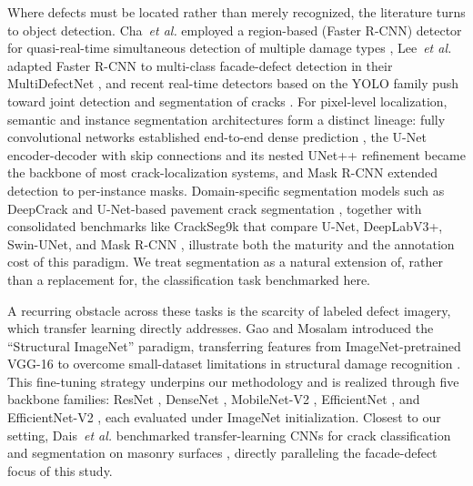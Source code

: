 \documentclass[conference]{IEEEtran}
\begin{document}
Where defects must be located rather than merely recognized, the literature turns to object detection. Cha~\textit{et al.} employed a region-based (Faster R-CNN) detector for quasi-real-time simultaneous detection of multiple damage types \cite{ref12}, Lee~\textit{et al.} adapted Faster R-CNN to multi-class facade-defect detection in their MultiDefectNet \cite{ref13}, and recent real-time detectors based on the YOLO family push toward joint detection and segmentation of cracks \cite{ref14}. For pixel-level localization, semantic and instance segmentation architectures form a distinct lineage: fully convolutional networks established end-to-end dense prediction \cite{ref15}, the U-Net encoder-decoder with skip connections \cite{ref16} and its nested UNet++ refinement \cite{ref17} became the backbone of most crack-localization systems, and Mask R-CNN \cite{ref18} extended detection to per-instance masks. Domain-specific segmentation models such as DeepCrack \cite{ref19} and U-Net-based pavement crack segmentation \cite{ref20}, together with consolidated benchmarks like CrackSeg9k that compare U-Net, DeepLabV3+, Swin-UNet, and Mask R-CNN \cite{ref21}, illustrate both the maturity and the annotation cost of this paradigm. We treat segmentation as a natural extension of, rather than a replacement for, the classification task benchmarked here.

A recurring obstacle across these tasks is the scarcity of labeled defect imagery, which transfer learning directly addresses. Gao and Mosalam introduced the ``Structural ImageNet'' paradigm, transferring features from ImageNet-pretrained VGG-16 \cite{ref23} to overcome small-dataset limitations in structural damage recognition \cite{ref22}. This fine-tuning strategy underpins our methodology and is realized through five backbone families: ResNet \cite{ref24}, DenseNet \cite{ref25}, MobileNet-V2 \cite{ref26}, EfficientNet \cite{ref27}, and EfficientNet-V2 \cite{ref28}, each evaluated under ImageNet initialization. Closest to our setting, Dais~\textit{et al.} benchmarked transfer-learning CNNs for crack classification and segmentation on masonry surfaces \cite{ref29}, directly paralleling the facade-defect focus of this study.
\end{document}
